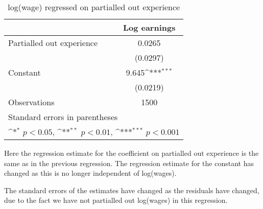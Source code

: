\documentclass{article}
\begin{document}
\begin{table}[htbp]\centering
\def\sym#1{\ifmmode^{#1}\else\(^{#1}\)\fi}
\caption{log(wage) regressed on partialled out experience}
\begin{tabular}{l*{1}{c}}
\hline\hline
                    &\multicolumn{1}{c}{Log earnings}\\
\hline
Partialled out experience&      0.0265         \\
                    &    (0.0297)         \\
[1em]
Constant            &       9.645\sym{***}\\
                    &    (0.0219)         \\
\hline
Observations        &        1500         \\
\hline\hline
\multicolumn{2}{l}{\footnotesize Standard errors in parentheses}\\
\multicolumn{2}{l}{\footnotesize \sym{*} \(p<0.05\), \sym{**} \(p<0.01\), \sym{***} \(p<0.001\)}\\
\end{tabular}
\end{table}

Here the regression estimate for the coefficient on partialled out experience is the same as in the previous regression. The regression estimate for the constant has changed as this is no longer independent of log(wages).

The standard errors of the estimates have changed as the residuals have changed, due to the fact we have not partialled out log(wages) in this regression.
\end{document}
